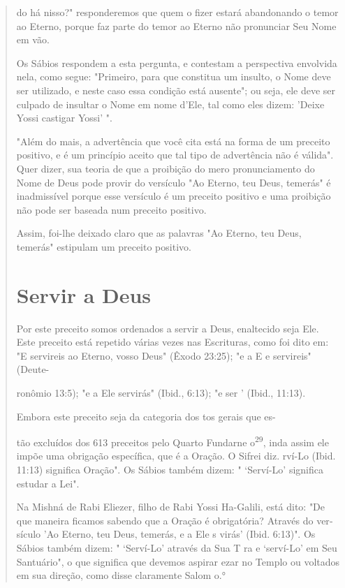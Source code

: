 \begin{quote}


do há nisso?" responderemos que quem o fizer estará abandonando o temor
ao Eterno, porque faz parte do temor ao Eterno não pronunciar Seu Nome
em vão.

Os Sábios respondem a esta pergunta, e contestam a perspectiva
en­volvida nela, como segue: "Primeiro, para que constitua um insulto, o
Nome deve ser utilizado, e neste caso essa condição está ausente"; ou
seja, ele deve ser culpado de insultar o Nome em nome d'Ele, tal como
eles dizem: 'Deixe Yossi castigar Yossi' ".

"Além do mais, a advertência que você cita está na forma de um pre­ceito
positivo, e é um princípio aceito que tal tipo de advertência não é
váli­da". Quer dizer, sua teoria de que a proibição do mero
pronunciamento do Nome de Deus pode provir do versículo "Ao Eterno, teu
Deus, temerás" é inad­missível porque esse versículo é um preceito
positivo e uma proibição não po­de ser baseada num preceito positivo.

Assim, foi-lhe deixado claro que as palavras "Ao Eterno, teu Deus,
temerás" estipulam um preceito positivo.


\section{Servir a Deus}

Por este preceito somos ordenados a servir a Deus, enaltecido seja Ele.
Este preceito está repetido várias vezes nas Escrituras, como foi dito
em: "E servireis ao Eterno, vosso Deus" (Êxodo 23:25); "e a E e
servireis" (Deute-

ronômio 13:5); "e a Ele servirás" (Ibid., 6:13); "e ser ' (Ibid.,
11:13).

Embora este preceito seja da categoria dos tos gerais que es-

tão excluídos dos 613 preceitos pelo Quarto Fundarne
o\textsuperscript{29}, inda assim ele im­põe uma obrigação específica,
que é a Oração. O Sifrei diz. rví-Lo (Ibid. 11:13) significa Oração". Os
Sábios também dizem: " `Serví-Lo' significa estudar a Lei".

Na Mishná de Rabi Eliezer, filho de Rabi Yossi Ha-Galili, está dito: "De
que maneira ficamos sabendo que a Oração é obrigatória? Através do
ver­sículo 'Ao Eterno, teu Deus, temerás, e a Ele s virás' (Ibid.
6:13)". Os Sábios também dizem: " `Serví-Lo' através da Sua T ra e
`serví-Lo' em Seu Santuá­rio", o que significa que devemos aspirar ezar
no Templo ou voltados em sua direção, como disse claramente Salom
o.°


\end{quote}
